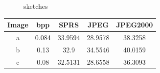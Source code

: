 \begin{figure}[h]
\centering
\setcounter{subfigure}{0}
\hspace{5mm}
\hspace{5mm}
\hspace{5mm}
\caption{sketches}
\label{fig:sketches}
\end{figure}


\begin{table}[H]
\centering
\begin{tabular}{| c c | c | c | c|}
\hline\hline
Image & bpp & SPRS & JPEG & JPEG2000 \\
\hline
a & 0.084 & 33.9594 & 28.9578 & 38.3258  \\
b & 0.13 & 32.9 & 34.5546 &  40.0159 \\
c & 0.08 & 32.5131 & 28.6558 & 36.3093  \\
\hline
\end{tabular}
\end{table}

